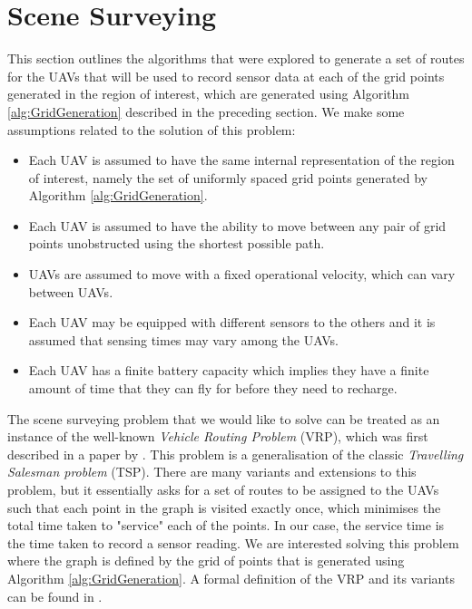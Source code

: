 
\section{Scene Surveying}\label{sec:SceneSurveying}
This section outlines the algorithms that were explored to generate a set of routes for the UAVs that will be used to record sensor data at each of the grid points generated in the region of interest, which are generated using Algorithm \ref{alg:GridGeneration} described in the preceding section. We make some assumptions related to the solution of this problem:
\begin{itemize}
    \item Each UAV is assumed to have the same internal representation of the region of interest, namely the set of uniformly spaced grid points generated by Algorithm \ref{alg:GridGeneration}.
    \item Each UAV is assumed to have the ability to move between any pair of grid points unobstructed using the shortest possible path.
    \item UAVs are assumed to move with a fixed operational velocity, which can vary between UAVs.
    \item Each UAV may be equipped with different sensors to the others and it is assumed that sensing times may vary among the UAVs.
    \item Each UAV has a finite battery capacity which implies they have a finite amount of time that they can fly for before they need to recharge.
\end{itemize}


The scene surveying problem that we would like to solve can be treated as an instance of the well-known \textit{Vehicle Routing Problem} (VRP), which was first described in a paper by \citeauthor{Dantzig1959TheProblem} \cite{Dantzig1959TheProblem}. This problem is a generalisation of the classic \textit{Travelling Salesman problem} (TSP). There are many variants and extensions to this problem, but it essentially asks for a set of routes to be assigned to the UAVs such that each point in the graph is visited exactly once, which minimises the total time taken to "service" each of the points. In our case, the service time is the time taken to record a sensor reading. We are interested solving this problem where the graph is defined by the grid of points that is generated using Algorithm \ref{alg:GridGeneration}. A formal definition of the VRP and its variants can be found in \cite{Toth2002TheProblem}.

